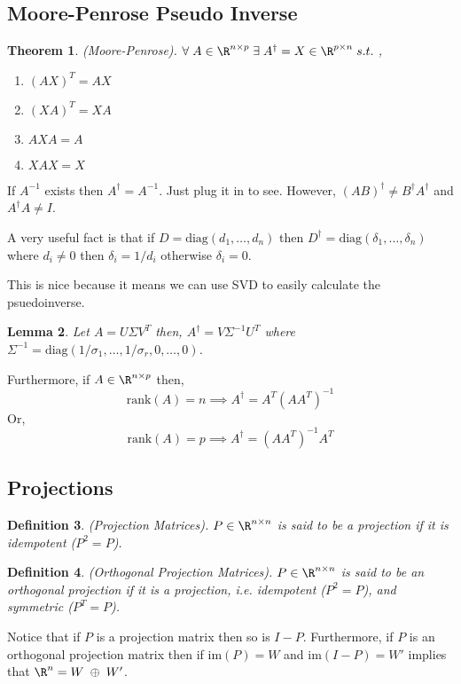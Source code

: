 \documentclass[twoside]{article}
\newcommand\rank[1]{\text{rank}(#1)}
\newcommand\im[1]{\text{im}(#1)}
\newcommand\diag[1]{\text{diag}(#1)}
\newtheorem{theorem}{Theorem}[section]
\newtheorem{lemma}[theorem]{Lemma}
\newtheorem{definition}[theorem]{Definition}
\begin{document}
\subsection{Moore-Penrose Pseudo Inverse}
\begin{theorem}(Moore-Penrose).
$\forall \; A \in \R^{n\times p} \; \exists \; A^\dagger = X \in \R^{p\times n} \; s.t. \;$,
\begin{enumerate}
\item $(AX)^T = AX$
\item $(XA)^T = XA$
\item $AXA = A$
\item $XAX = X$
\end{enumerate}

\end{theorem}

If $A^{-1}$ exists then $A^\dagger = A^{-1}$. Just plug it in to see. However, $(AB)^\dagger\neq B^\dagger A^\dagger$ and $A^\dagger A \neq I$.

A very useful fact is that if $D = \text{diag}(d_1,\dots,d_n)$ then $D^\dagger = \text{diag}(\delta_1, \dots, \delta_n)$ where $d_i \neq 0$ then $\delta_i = 1/d_i$ otherwise $\delta_i = 0$.

This is nice because it means we can use SVD to easily calculate the psuedoinverse.

\begin{lemma} Let $A = U\Sigma V^T$ then, $A^\dagger = V\Sigma^{-1}U^T$ where $\Sigma^{-1} = \diag{1/\sigma_1,\dots,1/\sigma_r,0,\dots,0}$.
\end{lemma}

Furthermore, if $A\in\R^{n\times p}$ then, $$\rank{A} = n \implies A^\dagger = A^T(AA^T)^{-1}$$ Or, $$\rank{A} = p \implies A^\dagger = (AA^T)^{-1}A^T$$

\subsection{Projections}
\begin{definition}(Projection Matrices). $P\in\R^{n\times n}$ is said to be a projection if it is idempotent ($P^2 = P$). 
\end{definition}
\begin{definition}(Orthogonal Projection Matrices). $P\in\R^{n\times n}$ is said to be an orthogonal projection if it is a projection, i.e. idempotent ($P^2 = P$), and symmetric ($P^T=P$). 
\end{definition}

Notice that if $P$ is a projection matrix then so is $I-P$. Furthermore, if $P$ is an orthogonal projection matrix then if $\im{P}=W$ and $\im{I-P}=W'$ implies that $\R^n = W\;\oplus\;W'$.
\end{document}

